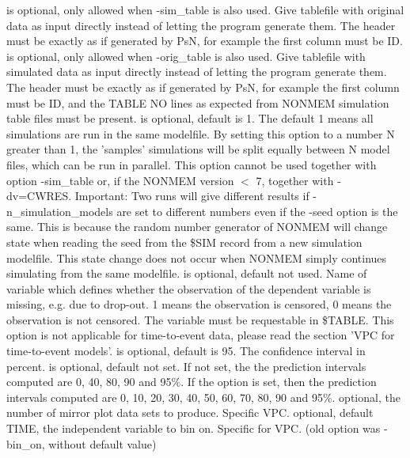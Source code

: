 \begin{optionlist}
\nextopt
{}
is optional, only allowed when -sim\_table is also used. Give tablefile with original data as input directly instead of letting the program generate them. The header must be exactly as if generated by PsN, for example the first column must be ID.
\nextopt
{}
is optional, only allowed when -orig\_table is also used. Give tablefile with simulated data as input directly instead of letting the program generate them.  The header must be exactly as if generated by PsN, for example the first column must be ID, and the TABLE NO lines as expected from NONMEM simulation table files must be present.
\nextopt
{}
is optional, default is 1. The default 1 means all simulations are run in the same modelfile. By setting this option to a number N greater than 1, the 'samples' simulations will be split equally between N model files, which can be run in parallel. This option cannot be used together with option -sim\_table or, if the NONMEM version $<$ 7, together with -dv=CWRES. Important: Two runs will give different results if -n\_simulation\_models are set to different numbers even if the -seed option is the same. This is because the random number generator of NONMEM will change state when reading the seed from the \$SIM record from a new simulation modelfile. This state change does not occur when NONMEM simply continues simulating from the same modelfile. 
\nextopt
{}
is optional, default not used. Name of variable which defines whether the observation of the dependent variable is missing, e.g. due to drop-out. 1 means the observation is censored, 0 means the observation is not censored. The variable must be requestable in \$TABLE. This option is not applicable for time-to-event data, please read the section 'VPC for time-to-event models'. 
\nextopt
{}
is optional, default is 95. The confidence interval in percent. 
\nextopt
{}
is optional, default not set. If not set, the the prediction intervals computed are 0, 40, 80, 90 and 95\%. If the option is set, then the prediction intervals computed are 0, 10, 20, 30, 40, 50, 60, 70, 80, 90 and 95\%.  
\nextopt
{}
optional, the number of mirror plot data sets to produce. Specific VPC. 
\nextopt
{}
optional, default TIME, the independent variable to bin on. Specific for VPC. (old  option was -bin\_on, without default value) 
\nextopt
\end{optionlist}
